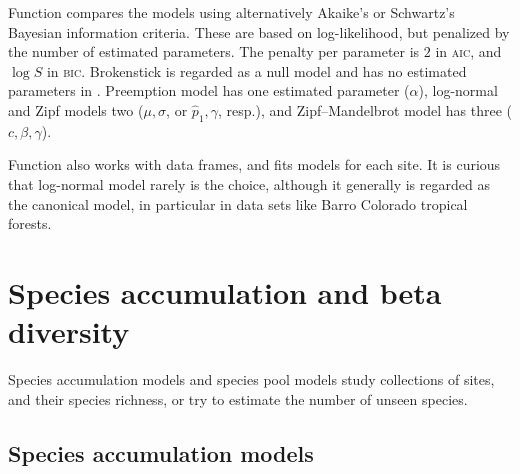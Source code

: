 \documentclass[a4paper,10pt,twocolumn]{article}
\begin{document}
Function  compares the models using alternatively
Akaike's or Schwartz's Bayesian information criteria.  These are based
on log-likelihood, but penalized by the number of estimated
parameters.  The penalty per parameter is $2$ in \textsc{aic}, and
$\log S$ in \textsc{bic}.  Brokenstick is regarded as a null model and
has no estimated parameters in .  Preemption model has
one estimated parameter ($\alpha$), log-normal and Zipf models two
($\mu, \sigma$, or $\hat p_1, \gamma$, resp.), and Zipf--Mandelbrot
model has three ($c, \beta, \gamma$).

Function  also works with data frames, and fits models
for each site. It is curious that log-normal model rarely is the
choice, although it generally is regarded as the canonical model, in
particular in data sets like Barro Colorado tropical forests.

\section{Species accumulation and beta diversity}

Species accumulation models and species pool models study collections
of sites, and their species richness, or try to estimate the number of
unseen species.

\subsection{Species accumulation models}
\end{document}
